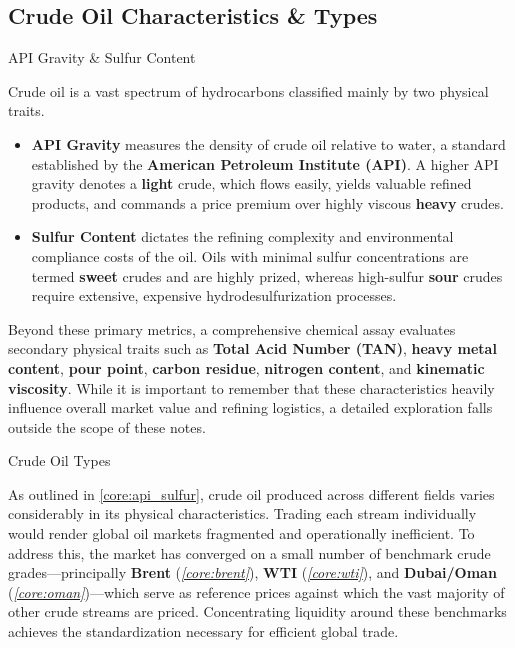 \documentclass[10pt]{article}
\begin{document}
    \subsection{Crude Oil Characteristics \& Types}

      \begin{core}[label=core:api_sulfur]{API Gravity \& Sulfur Content}

        Crude oil is a vast spectrum of hydrocarbons classified mainly by two physical traits.

        \begin{itemize}

          \item \textbf{API Gravity} measures the density of crude oil relative to water, a standard established by the \textbf{American Petroleum Institute (API)}. A higher API gravity denotes a \textbf{light} crude, which flows easily, yields valuable refined products, and commands a price premium over highly viscous \textbf{heavy} crudes.

          \item \textbf{Sulfur Content} dictates the refining complexity and environmental compliance costs of the oil. Oils with minimal sulfur concentrations are termed \textbf{sweet} crudes and are highly prized, whereas high-sulfur \textbf{sour} crudes require extensive, expensive hydrodesulfurization processes.

        \end{itemize}

        Beyond these primary metrics, a comprehensive chemical assay evaluates secondary physical traits such as \textbf{Total Acid Number (TAN)}, \textbf{heavy metal content}, \textbf{pour point}, \textbf{carbon residue}, \textbf{nitrogen content}, and \textbf{kinematic viscosity}. While it is important to remember that these characteristics heavily influence overall market value and refining logistics, a detailed exploration falls outside the scope of these notes.

      \end{core}

      \begin{core}{Crude Oil Types}

        As outlined in \autoref{core:api_sulfur}, crude oil produced across different fields varies considerably in its physical characteristics. Trading each stream individually would render global oil markets fragmented and operationally inefficient. To address this, the market has converged on a small number of benchmark crude grades---principally \textbf{Brent} (\textit{\autoref{core:brent}}), \textbf{WTI} (\textit{\autoref{core:wti}}), and \textbf{Dubai/Oman} (\textit{\autoref{core:oman}})---which serve as reference prices against which the vast majority of other crude streams are priced. Concentrating liquidity around these benchmarks achieves the standardization necessary for efficient global trade.

      \end{core}
\end{document}
